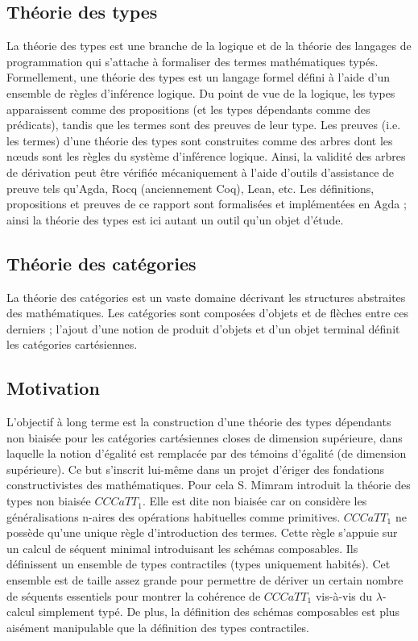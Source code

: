 \documentclass[conference]{IEEEtran}
\begin{document}
	\subsection{Théorie des types} La théorie des types est une branche de la logique et de la théorie des langages de programmation qui s'attache à formaliser des termes mathématiques typés. Formellement, une théorie des types est un langage formel défini à l'aide d'un ensemble de règles d'inférence logique. Du point de vue de la logique, les types apparaissent comme des propositions (et les types dépendants comme des prédicats), tandis que les termes sont des preuves de leur type. Les preuves (i.e. les termes) d'une théorie des types sont construites comme des arbres dont les nœuds sont les règles du système d'inférence logique. Ainsi, la validité des arbres de dérivation peut être vérifiée mécaniquement à l'aide d'outils d'assistance de preuve tels qu'Agda, Rocq (anciennement Coq), Lean, etc. Les définitions, propositions et preuves de ce rapport sont formalisées et implémentées en Agda ; ainsi la théorie des types est ici autant un outil qu'un objet d'étude.
	
	\subsection{Théorie des catégories} La théorie des catégories est un vaste domaine décrivant les structures abstraites des mathématiques. Les catégories sont composées d'objets et de flèches entre ces derniers ; l'ajout d'une notion de produit d'objets et d'un objet terminal définit les catégories cartésiennes.
	
	\subsection{Motivation} L'objectif à long terme est la construction d'une théorie des types dépendants non biaisée pour les catégories cartésiennes closes de dimension supérieure, dans laquelle la notion d'égalité est remplacée par des témoins d'égalité (de dimension supérieure). Ce but s'inscrit lui-même dans un projet d'ériger des fondations constructivistes des mathématiques. Pour cela S. Mimram introduit la théorie des types non biaisée $CCCaTT_1$. Elle est dite non biaisée car on considère les généralisations n-aires des opérations habituelles comme primitives. $CCCaTT_1$ ne possède qu'une unique règle d’introduction des termes. Cette règle s'appuie sur un calcul de séquent minimal introduisant les schémas composables. Ils définissent un ensemble de types contractiles (types uniquement habités). Cet ensemble est de taille assez grande pour permettre de dériver un certain nombre de séquents essentiels pour montrer la cohérence de $CCCaTT_1$ vis-à-vis du $\lambda$-calcul simplement typé. De plus, la définition des schémas composables est plus aisément manipulable que la définition des types contractiles.
	
\end{document}
